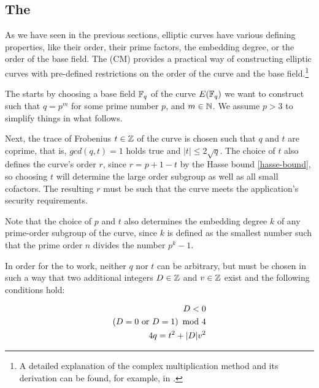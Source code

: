 \subsection{The }\label{complex-multiplication-method}
As we have seen in the previous sections, elliptic curves have various defining properties, like their order, their prime factors, the embedding degree, or the order of the base field. The  (CM) provides a practical way of constructing elliptic curves with pre-defined restrictions on the order of the curve and the base field.\footnote{A detailed explanation of the complex multiplication
method and its derivation can be found, for example, in \cite{grech-2012}.}


The  starts by choosing a base field $\mathbb{F}_{q}$ of the curve $E(\mathbb{F}_q)$ we want to construct such that $q = p^m$ for some prime number $p$, and  $m\in \mathbb{N}$. We assume $p>3$ to simplify things in what follows. 

Next, the trace of Frobenius $t\in \mathbb{Z}$ of the curve is chosen such that $q$ and $t$ are coprime, that is, $gcd(q,t)=1$ holds true and $|t|\leq 2\sqrt{q}$. The choice of $t$ also defines the curve's order $r$, since $r=p+1-t$ by the Hasse bound \eqref{hasse-bound}, so choosing $t$ will determine the large order subgroup as well as all small cofactors. The resulting $r$ must be such that the curve meets the application's security requirements. 

Note that the choice of $p$ and $t$ also determines the embedding degree $k$ of any prime-order subgroup of the curve, since $k$ is defined as the smallest number such that the prime order $n$ divides the number $p^k-1$.

In order for the  to work, neither $q$ nor $t$ can be arbitrary, but must be chosen in such a way that two additional integers $D\in \mathbb{Z}$ and $v\in \mathbb{Z}$ exist and the following conditions hold:

\begin{equation}\label{eq:D-criteria}
\begin{split}
D<0\\
\left( D =0  \text{ or } D=1\right) \text{ mod } 4\\
4q  = t^2 + |D|v^2 
\end{split}
\end{equation}

